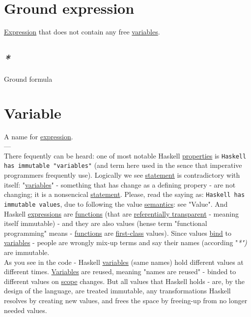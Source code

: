 \documentclass[a4paper,14pt,oneside]{book}
\begin{document}
\section{\label{orgf35f3b3}Ground expression}
\label{sec:org25bf1fb}
\hyperref[orgf3b860b]{Expression} that does not contain any free \hyperref[org7c2f350]{variables}.\\

\subsection{\emph{*}}
\label{sec:org3870438}

\label{orgc6a1514}Ground formula\\

\section{\label{org3ae9925}Variable}
\label{sec:org71ead89}
A name for \hyperref[orgf3b860b]{expression}.\\

---\\

There fequently can be heard: one of most notable Haskell \hyperref[org39b32f5]{properties} is \texttt{Haskell has immutable "variables"} (and term here used in the sence that imperative programmers frequently use). Logically we see \hyperref[orgc8df20b]{statement} is contradictory with itself: "\hyperref[org7c2f350]{variables}" - something that has change as a defining propery - are not changing; it is a nonsencical \hyperref[orgc8df20b]{statement}. Please, read the saying as: \texttt{Haskell has immutable values}, due to following the value \hyperref[org80c76dc]{semantics}: see "Value". And Haskell \hyperref[orgd8e62bb]{expressions} are \hyperref[org0da3116]{functions} (that are \hyperref[orga34ca16]{referentially transparent} - meaning itself immutable) - and they are also values (hense term "functional programming" means - \hyperref[org0da3116]{functions} are \hyperref[orge737f11]{first-class} values). Since values \hyperref[org624c8a5]{bind} to \hyperref[org7c2f350]{variables} - people are wrongly mix-up terms and say their names (according "\emph{*")} are immutable.\\

As you see in the code - Haskell \hyperref[org7c2f350]{variables} (same names) hold different values at different times. \hyperref[org7c2f350]{Variables} are reused, meaning "names are reused" - binded to different values on \hyperref[org71645c8]{scope} changes. But all values that Haskell holds - are, by the design of the language, are treated immutable, any transformations Haskell resolves by creating new values, and frees the space by freeing-up from no longer needed values.\\
\end{document}
